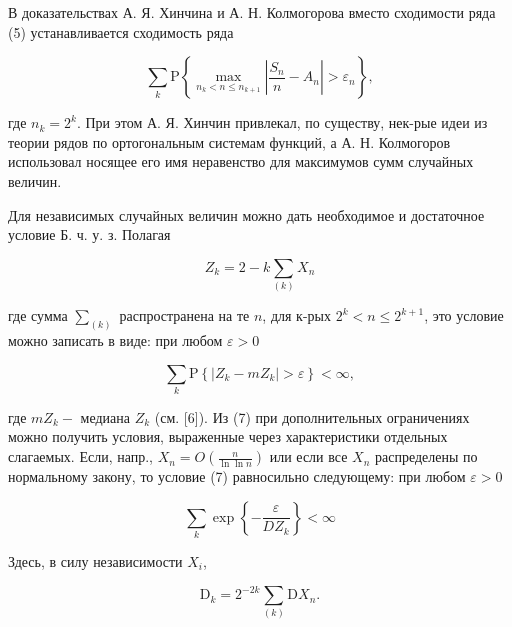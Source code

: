 \documentclass[10pt]{article}
\begin{document}
В доказательствах А. Я. Хинчина и А. Н. Колмогорова вместо сходимости ряда (5) устанавливается сходимость ряда



\[

\sum_{k} \mathrm{P}\left\{\max _{n_{k}<n \leqslant n_{k+1}}\left|\frac{S_{n}}{n}-A_{n}\right|>\varepsilon_{n}\right\},

\]



где $n_{k}=2^{k}$. При этом А. Я. Хинчин привлекал, по существу, нек-рые идеи из теории рядов по ортогональным системам функций, а А. Н. Колмогоров использовал носящее его имя неравенство для максимумов сумм случайных величин.



Для независимых случайных величин можно дать необходимое и достаточное условие Б. ч. у. з. Полагая



\[

Z_{k}=2-k \sum_{(k)} X_{n}

\]



где сумма $\sum_{(k)}$ распространена на те $n$, для к-рых $2^{k}<n \leqslant 2^{k+1}$, это условие можно записать в виде: при любом $\varepsilon>0$



\[

\sum_{k} \mathrm{P}\left\{\left|Z_{k}-m Z_{k}\right|>\varepsilon\right\}<\infty,

\]



где $m Z_{k}-$ медиана $Z_{k}$ (см. [6]). Из (7) при дополнительных ограничениях можно получить условия, выраженные через характеристики отдельных слагаемых. Если, напр., $X_{n}=O\left(\frac{n}{\ln \ln n}\right)$ или если все $X_{n}$ распределены по нормальному закону, то условие (7) равносильно следующему: при любом $\varepsilon>0$



\[

\sum_{k} \exp \left\{-\frac{\varepsilon}{D Z_{k}}\right\}<\infty

\]



Здесь, в силу независимости $X_{i}$,



\[

\mathrm{D}_{k}=2^{-2 k} \sum_{(k)} \mathrm{D} X_{n} .

\]
\end{document}
